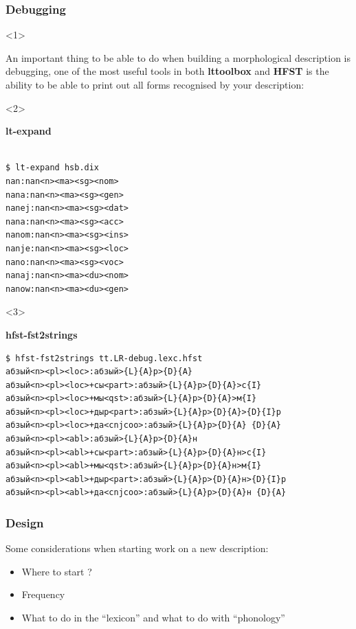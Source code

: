 \documentclass[10pt,xetex]{beamer} %
\begin{document}
\begin{frame}[fragile]
  \frametitle{Debugging}

\begin{onlyenv}<1>

An important thing to be able to do when building a morphological description
is debugging, one of the most useful tools in both {\bf lttoolbox} and {\bf HFST}
is the ability to be able to print out all forms recognised by your description:

\end{onlyenv}

\begin{onlyenv}<2>
\begin{center}
{\bf lt-expand}
\end{center}
 \begin{verbatim}

$ lt-expand hsb.dix
nan:nan<n><ma><sg><nom>
nana:nan<n><ma><sg><gen>
nanej:nan<n><ma><sg><dat>
nana:nan<n><ma><sg><acc>
nanom:nan<n><ma><sg><ins>
nanje:nan<n><ma><sg><loc>
nano:nan<n><ma><sg><voc>
nanaj:nan<n><ma><du><nom>
nanow:nan<n><ma><du><gen>
\end{verbatim}

\end{onlyenv}

\begin{onlyenv}<3>
\begin{center}
{\bf hfst-fst2strings}
\end{center}
 \begin{verbatim}
$ hfst-fst2strings tt.LR-debug.lexc.hfst
абзый<n><pl><loc>:абзый>{L}{A}р>{D}{A}
абзый<n><pl><loc>+сы<part>:абзый>{L}{A}р>{D}{A}>с{I}
абзый<n><pl><loc>+мы<qst>:абзый>{L}{A}р>{D}{A}>м{I}
абзый<n><pl><loc>+дыр<part>:абзый>{L}{A}р>{D}{A}>{D}{I}р
абзый<n><pl><loc>+да<cnjcoo>:абзый>{L}{A}р>{D}{A} {D}{A}
абзый<n><pl><abl>:абзый>{L}{A}р>{D}{A}н
абзый<n><pl><abl>+сы<part>:абзый>{L}{A}р>{D}{A}н>с{I}
абзый<n><pl><abl>+мы<qst>:абзый>{L}{A}р>{D}{A}н>м{I}
абзый<n><pl><abl>+дыр<part>:абзый>{L}{A}р>{D}{A}н>{D}{I}р
абзый<n><pl><abl>+да<cnjcoo>:абзый>{L}{A}р>{D}{A}н {D}{A}
\end{verbatim}

\end{onlyenv}



\end{frame}

\begin{frame}
  \frametitle{Design}

Some considerations when starting work on a new description:

\begin{itemize}

  \item Where to start ?

  \item Frequency

  \item What to do in the ``lexicon'' and what to do with ``phonology''
\end{itemize}


\end{frame}
\end{document}
